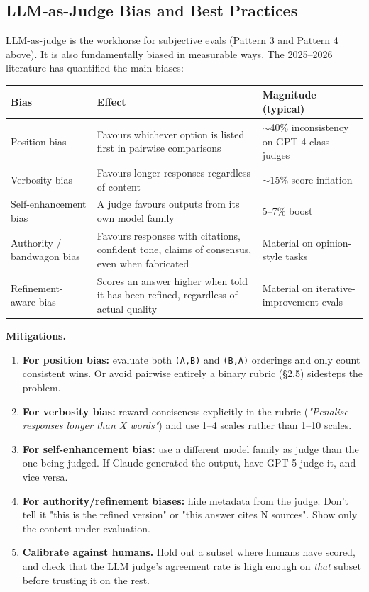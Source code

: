 \documentclass[a4paper,11pt]{article}
\begin{document}
\subsection{LLM-as-Judge \textemdash{} Bias and Best Practices}

LLM-as-judge is the workhorse for subjective evals (Pattern 3 and
Pattern 4 above). It is also fundamentally biased in measurable ways.
The 2025–2026 literature has quantified the main biases:

\begin{center}\small
\begin{tabular}{p{3.5cm} p{4.5cm} p{4.5cm}}
  \toprule
  \textbf{Bias} & \textbf{Effect} & \textbf{Magnitude (typical)} \\
  \midrule
  Position bias & Favours whichever option is listed first in pairwise comparisons & $\sim$40\% inconsistency on GPT-4-class judges \\
  Verbosity bias & Favours longer responses regardless of content & $\sim$15\% score inflation \\
  Self-enhancement bias & A judge favours outputs from its own model family & 5–7\% boost \\
  Authority / bandwagon bias & Favours responses with citations, confident tone, claims of consensus, even when fabricated & Material on opinion-style tasks \\
  Refinement-aware bias & Scores an answer higher when told it has been refined, regardless of actual quality & Material on iterative-improvement evals \\
  \bottomrule
\end{tabular}
\end{center}

\textbf{Mitigations.}
\begin{enumerate}[noitemsep, leftmargin=1.4em]
  \item \textbf{For position bias:} evaluate both \texttt{(A,B)} and
        \texttt{(B,A)} orderings and only count consistent wins. Or
        avoid pairwise entirely \textemdash{} a binary rubric (§2.5)
        sidesteps the problem.
  \item \textbf{For verbosity bias:} reward conciseness explicitly in
        the rubric (\textit{"Penalise responses longer than X
        words"}) and use 1–4 scales rather than 1–10 scales.
  \item \textbf{For self-enhancement bias:} use a different model
        family as judge than the one being judged. If Claude
        generated the output, have GPT-5 judge it, and vice versa.
  \item \textbf{For authority/refinement biases:} hide metadata from
        the judge. Don't tell it "this is the refined version" or
        "this answer cites N sources". Show only the content under
        evaluation.
  \item \textbf{Calibrate against humans.} Hold out a subset where
        humans have scored, and check that the LLM judge's agreement
        rate is high enough on \emph{that} subset before trusting it
        on the rest.
\end{enumerate}
\end{document}
